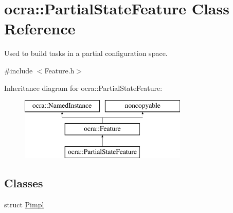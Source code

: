 \hypertarget{classocra_1_1PartialStateFeature}{}\section{ocra\+:\+:Partial\+State\+Feature Class Reference}
\label{classocra_1_1PartialStateFeature}


Used to build tasks in a partial configuration space.  




{\ttfamily \#include $<$Feature.\+h$>$}

Inheritance diagram for ocra\+:\+:Partial\+State\+Feature\+:\begin{figure}[H]
\begin{center}
\leavevmode
\includegraphics[height=3.000000cm]{dc/daf/classocra_1_1PartialStateFeature}
\end{center}
\end{figure}
\subsection*{Classes}
\begin{DoxyCompactItemize}
\item 
struct \hyperlink{structocra_1_1PartialStateFeature_1_1Pimpl}{Pimpl}
\end{DoxyCompactItemize}
